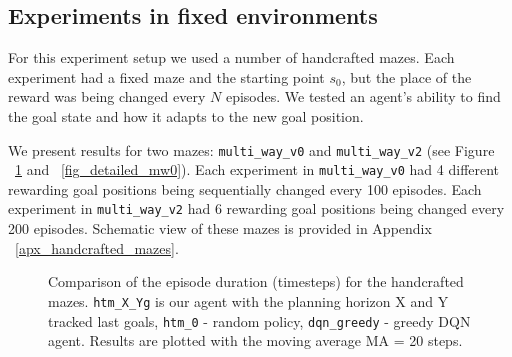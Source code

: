 \documentclass[runningheads]{llncs}
\begin{document}
\subsection{Experiments in fixed environments}

For this experiment setup we used a number of handcrafted mazes. Each experiment had a fixed maze and the starting point $s_0$, but the place of the reward was being changed every $N$ episodes. We tested an agent's ability to find the goal state and how it adapts to the new goal position.

We present results for two mazes: \texttt{multi\_way\_v0} and \texttt{multi\_way\_v2} (see Figure ~\ref{fig_comparison_mw} and ~\ref{fig_detailed_mw0}). Each experiment in \texttt{multi\_way\_v0} had 4 different rewarding goal positions being sequentially changed every 100 episodes. Each experiment in \texttt{multi\_way\_v2} had 6 rewarding goal positions being changed every 200 episodes. Schematic view of these mazes is provided in Appendix ~\ref{apx_handcrafted_mazes}.

\begin{figure}
  \centering
  \begin{minipage}{.49\linewidth}
    
  \end{minipage}
  \begin{minipage}{.49\linewidth}
    
  \end{minipage}
  \caption{Comparison of the episode duration (timesteps) for the handcrafted mazes. \texttt{htm\_X\_Yg} is our agent with the planning horizon X and Y tracked last goals, \texttt{htm\_0} - random policy, \texttt{dqn\_greedy} - greedy DQN agent. Results are plotted with the moving average MA = 20 steps.} \label{fig_comparison_mw}
\end{figure}
\end{document}
